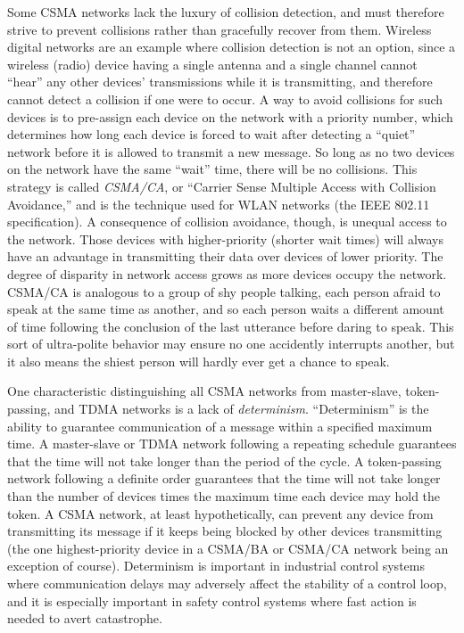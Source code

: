 Some CSMA networks lack the luxury of collision detection, and must therefore strive to prevent collisions rather than gracefully recover from them.  Wireless digital networks are an example where collision detection is not an option, since a wireless (radio) device having a single antenna and a single channel cannot ``hear'' any other devices' transmissions while it is transmitting, and therefore cannot detect a collision if one were to occur.  A way to avoid collisions for such devices is to pre-assign each device on the network with a priority number, which determines how long each device is forced to wait after detecting a ``quiet'' network before it is allowed to transmit a new message.  So long as no two devices on the network have the same ``wait'' time, there will be no collisions.  This strategy is called \textit{CSMA/CA}, or ``Carrier Sense Multiple Access with Collision Avoidance,'' and is the technique used for WLAN networks (the IEEE 802.11 specification).  A consequence of collision avoidance, though, is unequal access to the network.  Those devices with higher-priority (shorter wait times) will always have an advantage in transmitting their data over devices of lower priority.  The degree of disparity in network access grows as more devices occupy the network.  CSMA/CA is analogous to a group of shy people talking, each person afraid to speak at the same time as another, and so each person waits a different amount of time following the conclusion of the last utterance before daring to speak.  This sort of ultra-polite behavior may ensure no one accidently interrupts another, but it also means the shiest person will hardly ever get a chance to speak.      

\vskip 10pt

One characteristic distinguishing all CSMA networks from master-slave, token-passing, and TDMA networks is a lack of \textit{determinism}.  ``Determinism'' is the ability to guarantee communication of a message within a specified maximum time.  A master-slave or TDMA network following a repeating schedule guarantees that the time will not take longer than the period of the cycle.  A token-passing network following a definite order guarantees that the time will not take longer than the number of devices times the maximum time each device may hold the token.  A CSMA network, at least hypothetically, can prevent any device from transmitting its message if it keeps being blocked by other devices transmitting (the one highest-priority device in a CSMA/BA or CSMA/CA network being an exception of course).  Determinism is important in industrial control systems where communication delays may adversely affect the stability of a control loop, and it is especially important in safety control systems where fast action is needed to avert catastrophe.  

